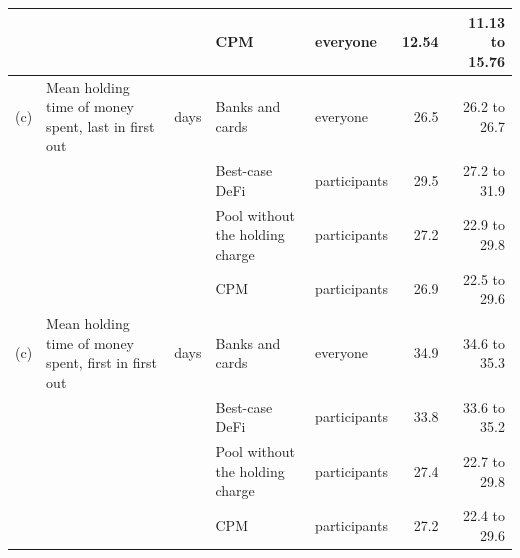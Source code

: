\begin{tabular}{lllllrr}
 &  &  & CPM & everyone & 12.54 & 11.13 to 15.76 \\
\midrule
(c) & Mean holding time of money spent, last in first out & days & Banks and cards & everyone & 26.5 & 26.2 to 26.7 \\
 &  &  & Best-case DeFi & participants & 29.5 & 27.2 to 31.9 \\
 &  &  & Pool without the holding charge & participants & 27.2 & 22.9 to 29.8 \\
 &  &  & CPM & participants & 26.9 & 22.5 to 29.6 \\
\midrule
(c) & Mean holding time of money spent, first in first out & days & Banks and cards & everyone & 34.9 & 34.6 to 35.3 \\
 &  &  & Best-case DeFi & participants & 33.8 & 33.6 to 35.2 \\
 &  &  & Pool without the holding charge & participants & 27.4 & 22.7 to 29.8 \\
 &  &  & CPM & participants & 27.2 & 22.4 to 29.6 \\
\bottomrule
\end{tabular}
